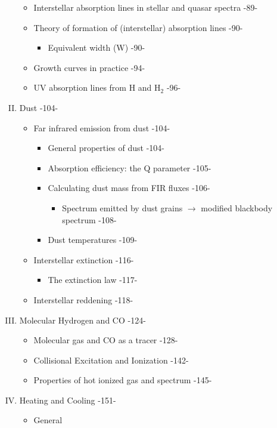 \documentclass{article}
\begin{document}
\begin{enumerate}[I.]
\begin{itemize}
  \item Interstellar absorption lines in stellar and quasar spectra -89-
  \item Theory of formation of (interstellar) absorption lines -90-
      \begin{itemize}
          \item Equivalent width (W) -90-
      \end{itemize}
  \item Growth curves in practice -94-
  \item UV absorption lines from H and H$_2$ -96-
\end{itemize}
\item Dust -104-
    \begin{itemize}
  \item Far infrared emission from dust -104-
  \begin{itemize}
    \item General properties of dust -104-
    \item Absorption efficiency: the Q parameter -105-
    \item Calculating dust mass from FIR fluxes -106-
    \begin{itemize}
      \item Spectrum emitted by dust grains $\rightarrow$
      modified blackbody spectrum -108-
    \end{itemize}
    \item Dust temperatures -109-
  \end{itemize}
  \item Interstellar extinction -116-
  \begin{itemize}
    \item The extinction law -117-
  \end{itemize}
  \item Interstellar reddening -118-
    \end{itemize}
  \item Molecular Hydrogen and CO -124-
      \begin{itemize}
  \item Molecular gas and CO as a tracer -128-
  \item Collisional Excitation and Ionization -142-
  \item Properties of hot ionized gas and spectrum -145-
  \end{itemize}
  \item Heating and Cooling -151-
    \begin{itemize}
      \item General

\end{itemize}
\end{enumerate}
\end{document}
